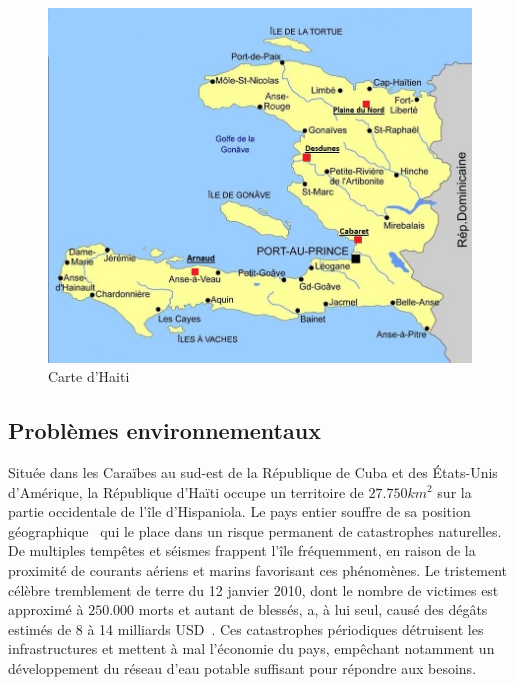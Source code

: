 \documentclass{EPL-master-thesis-covers-FR}
\begin{document}
			\begin{figure}[ht]
					\includegraphics[width=\textwidth]{images/carte_haiti}
					\caption{Carte d'Haiti}
					\label{fig:carte_haiti}
				\end{figure}

			\subsection*{Problèmes environnementaux}

				Située dans les Caraïbes au sud-est de la République de Cuba et des \'Etats-Unis d'Amérique, la République d'Haïti occupe un territoire de $27.750km^{2}$ sur la partie occidentale de l'île d'Hispaniola. Le pays entier souffre de sa position géographique~\cite{ref:regards_situation_eau_haiti} qui le place dans un risque permanent de catastrophes naturelles. De multiples tempêtes et séismes frappent l'île fréquemment, en raison de la proximité de courants aériens et marins favorisant ces phénomènes. Le tristement célèbre tremblement de terre du 12 janvier 2010, dont le nombre de victimes est approximé à $250.000$ morts et autant de blessés, a, à lui seul, causé des dégâts estimés de 8 à 14 milliards USD~\cite{ref:estimating_economic_damage_earthquake_haiti}. Ces catastrophes périodiques détruisent les infrastructures et mettent à mal l'économie du pays, empêchant notamment un développement du réseau d'eau potable suffisant pour répondre aux besoins.
\end{document}
